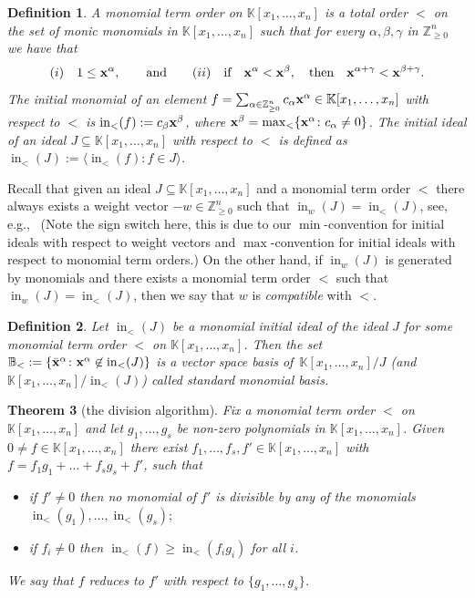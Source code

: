 \documentclass[10pt,a4paper]{amsart}
\newcommand{\thlabel}[1]{\label{#1}}
\newtheorem{Theorem}{Theorem}[section]
\newtheorem{Definition}[Theorem]{Definition}
\numberwithin{equation}{section}
\DeclareMathOperator{\init}{in}
\begin{document}
\begin{Definition}\thlabel{def:mono order}
A {\it monomial term order} on $\mathbb K[x_1, \dots , x_n]$ is a total order $<$ on the set of monic monomials in $\mathbb K[x_1, \dots , x_n]$ such that for every $\alpha,\beta,\gamma$ in $\mathbb Z_{\ge 0}^n$ we have that
\[
(i)\quad 1\le {\bf x}^\alpha,\qquad \text{and}\qquad
(ii)\quad \text{if}\quad {\bf x}^\alpha<{\bf x}^\beta, \quad \text{then}\quad {\bf x}^{\alpha+\gamma}<{\bf x}^{\beta+\gamma}.
\]
The {\it initial monomial} of an element $f=\sum_{\alpha\in \mathbb{Z}^n_{\geq 0}} c_{\alpha} {\bf x}^{\alpha}\in \mathbb K[x_1, \dots , x_n]$ with respect to $<$ is $\init_<(f):=c_\beta{\bf x}^{\beta}$, where ${\bf x}^\beta=\max_<\{{\bf x}^\alpha\colon c_\alpha\not=0\}$.
The {\it initial ideal} of an ideal $J\subseteq \mathbb K[x_1, \dots , x_n]$ with respect to $<$ is defined as $\init_<(J):=\langle \init_<(f)\colon f\in J\rangle$.
\end{Definition}

Recall that given an ideal $J\subseteq \mathbb K[x_1, \dots , x_n]$ and a monomial term order $<$ there always exists a weight vector $-w\in \mathbb{Z}_{\geq 0}^n$
such that $\init_w(J)=\init_<(J)$, see, e.g.,~\cite[Theorem~3.1.2]{herzog2011monomial} (Note the sign switch here, this is due to our $\min$-convention for initial ideals with respect to weight vectors and $\max$-convention for initial ideals with respect to monomial term orders.)
On the other hand, if $\init_w(J)$ is generated by monomials and there exists a monomial term order $<$ such that $\init_w(J)=\init_{<}(J)$, then
we say that $w$ is {\it compatible} with $<$.


\begin{Definition}\thlabel{def:SMT}
Let $\init_<(J)$ be a monomial initial ideal of the ideal $J$ for some monomial term order $<$ on $\mathbb{K}[x_1,\ldots,x_n]$. %
Then the set $\mathbb B_{<}:=\{\bar{\bf x}^\alpha \colon {\bf x}^\alpha\not \in \init_<(J)\}$ is a vector space basis of~$\mathbb K[x_1, \dots , x_n]/J$ (and $\mathbb K[x_1, \dots , x_n]/\init_<(J)$) called {\it standard monomial basis}.
\end{Definition}


{\samepage\begin{Theorem}[{the division algorithm}]\thlabel{division alg}
Fix a monomial term order $<$ on $\mathbb K[x_1,\dots,x_n]$ and let $g_1,\dots,g_s$ be non-zero polynomials in $\mathbb K[x_1,\dots,x_n]$. Given $0\not=f\in\mathbb K[x_1,\dots,x_n]$ there exist $f_1,\dots,f_s,f'\in \mathbb K[x_1,\dots,x_n]$ with $f= f_1g_1+\dots+f_sg_s+f'$, such that
\begin{itemize}\itemsep=0pt
\item[$(i)$] if $f'\neq0$ then no monomial of $f'$ is divisible by any of the monomials $\init_<(g_1),\dots,\init_<(g_s);$
\item[$(ii)$] if $f_i\not=0$ then $\init_<(f)\ge\init_<(f_ig_i)$ for all $i$.
\end{itemize}
We say that $f$ reduces to $f'$ with respect to $\{g_1,\dots,g_s\}$.
\end{Theorem}

}
\end{document}
